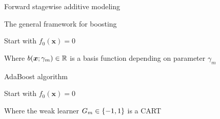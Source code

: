 \begin{frame}{Forward stagewise additive modeling}

The general framework for boosting  %

{%
\setlength{\interspacetitleruled}{0pt}%
\setlength{\algotitleheightrule}{0pt}%
\begin{algorithm}[H]
Start with $f_0(\boldsymbol{x})=0$\;
\end{algorithm}}

Where $b(\boldsymbol{x};\gamma_m)\in\mathbb{R}$ is a basis function depending on parameter $\gamma_m$ %
\end{frame}


\begin{frame}[fragile]{AdaBoost algorithm}

{%
\setlength{\interspacetitleruled}{0pt}%
\setlength{\algotitleheightrule}{0pt}%
\begin{algorithm}[H]
Start with $f_0(\boldsymbol{x})=0$\;
\end{algorithm}}

Where the weak learner $G_m\in\{-1,1\}$ is a CART

\end{frame}


